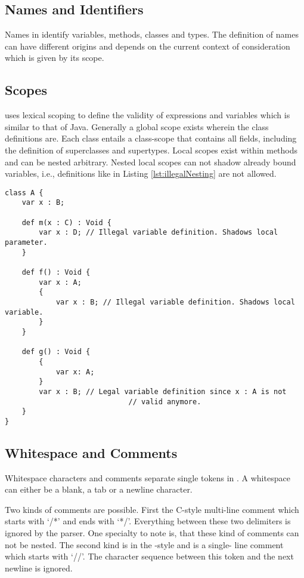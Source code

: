 \subsection{Names and Identifiers}
Names in \ooplss identify variables, methods, classes and types. The
definition of names can have different origins and depends on the current
context of consideration which is given by its scope.

\subsection{Scopes}
\ooplss uses lexical scoping to define the validity of expressions and
variables which is similar to that of Java. Generally a global
scope exists wherein the class definitions are. Each class entails a class-scope
that contains all fields, including the definition of superclasses and
supertypes. Local scopes exist within methods and can be nested arbitrary.
Nested local scopes can not shadow already bound variables, i.e., definitions
like in Listing \ref{lst:illegalNesting} are not allowed.

\begin{lstlisting}[float=ht,language=ooplss,caption=Variable definition in local scope.,label=lst:illegalNesting]
class A {
	var x : B;

	def m(x : C) : Void {
		var x : D; // Illegal variable definition. Shadows local parameter.
	}

	def f() : Void {
		var x : A;
		{
			var x : B; // Illegal variable definition. Shadows local variable.
		}
	}

	def g() : Void {
		{
			var x: A;
		}
		var x : B; // Legal variable definition since x : A is not
							 // valid anymore.
	}
}
\end{lstlisting}
\subsection{Whitespace and Comments}
Whitespace characters and comments separate single tokens in \ooplss. A
whitespace can either be a blank, a tab or a newline character.

Two kinds of comments are possible. First the C-style multi-line comment which
starts with `/*' and ends with `*/'. Everything between these two delimiters
is ignored by the parser. One specialty to note is, that these kind of comments
can not be nested.
The second kind is in the \cpp-style and is a single- line comment which starts
with `//'. The character sequence between this token and the next newline
is ignored.


